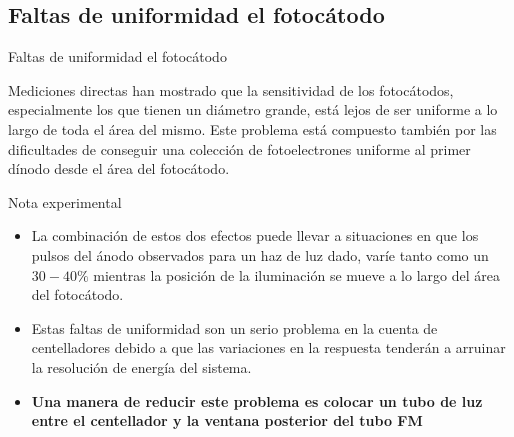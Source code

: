 \documentclass[a4paper,10pt]{beamer}
\begin{document}
\subsection{Faltas de uniformidad el fotocátodo}
\begin{frame}{Faltas de uniformidad el fotocátodo}

\begin{justify}
 
 Mediciones directas han mostrado que la sensitividad de los fotocátodos, especialmente 
 los que tienen un diámetro grande, está lejos de ser uniforme a lo largo de toda el 
 área del mismo. Este problema está compuesto también por las dificultades de conseguir 
 una colección de fotoelectrones uniforme al primer dínodo desde el área del fotocátodo.
 
 \begin{exampleblock}{Nota experimental}
  \begin{itemize}[<+->]
   \item \begin{justify}
	La combinación de estos dos efectos puede llevar a situaciones en que los pulsos 
	del ánodo observados para un haz de luz dado, varíe tanto como un $30-40\%$ mientras 
	la posición de la iluminación se mueve a lo largo del área del fotocátodo.
	 \end{justify}
   \item \begin{justify}
	Estas faltas de uniformidad son un serio problema en la cuenta de centelladores
	debido a que las variaciones en la respuesta tenderán a arruinar la resolución 
	de energía del sistema. 
	 \end{justify}
  \item \begin{justify}
	\textbf{Una manera de reducir este problema es colocar un tubo de luz entre 
	el centellador y la ventana posterior del tubo FM}
	 \end{justify}
  \end{itemize}
 \end{exampleblock}

\end{justify}
\end{frame}
\end{document}
